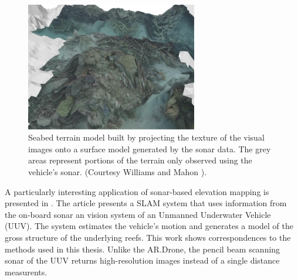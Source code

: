 \begin{figure}[htb]
\centering
\includegraphics[width=7.5cm]{images/williams_seabed_map.jpg}
\caption{Seabed terrain model built by projecting the texture of the visual images onto a surface model generated by the sonar data.
The grey areas represent portions of the terrain only observed using the vehicle’s sonar. (Courtesy Williams and Mahon \cite{williams2004simultaneous}).}
\label{fig:williams_seabed_map}
\end{figure}

A particularly interesting application of sonar-based elevation mapping is presented in \cite{williams2004simultaneous}.
The article presents a SLAM system that uses information from the on-board sonar an vision system of an Unmanned Underwater Vehicle (UUV).
The system estimates the vehicle's motion and generates a model of the gross structure of the underlying reefs.
This work shows correspondences to the methods used in this thesis.
Unlike the AR.Drone, the pencil beam scanning sonar of the UUV returns high-resolution images instead of a single distance measurents.

